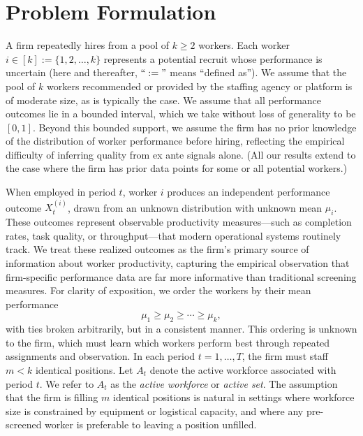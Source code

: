 \documentclass[opre,blindrev]{informs3}
\begin{document}
\section{Problem Formulation}
\label{formulation}

A firm repeatedly hires from a pool of \(k \ge 2\) workers. Each worker \(i \in [k] := \{1,2,\dots,k\}\) represents a potential recruit whose performance is uncertain (here and thereafter, \(``:="\) means ``defined as''). We assume that the pool of \(k\) workers recommended or provided by the staffing agency or platform is of moderate size, as is typically the case.
We assume that all performance outcomes lie in a bounded interval, which we take without loss of generality to be \([0,1]\). 
Beyond this bounded support, we assume the firm has no prior knowledge of the distribution of worker performance before hiring, reflecting the empirical difficulty of inferring quality from ex ante signals alone. (All our results extend to the case where the firm has prior data points for some or all potential workers.)

When employed in period $t$, worker \(i\) produces an independent performance outcome \(X_t^{(i)}\), drawn from an unknown distribution with unknown mean \(\mu_i\). These outcomes represent observable productivity measures---such as completion rates, task quality, or throughput---that modern operational systems routinely track. We treat these realized outcomes as the firm's primary source of information about worker productivity, capturing the empirical observation that firm-specific performance data are far more informative than traditional screening measures. For clarity of exposition, we order the workers by their mean performance 
\[
    \mu_1 \geq \mu_2 \geq \cdots \geq \mu_k,
\]
with ties broken arbitrarily, but in a consistent manner. This ordering is unknown to the firm, which must learn which workers perform best through repeated assignments and observation. In each period \(t = 1, \dots, T\), the firm must staff \(m < k\) identical positions. Let \(A_t\) denote the active workforce associated with period \(t\). We refer to \(A_t\) as the \emph{active workforce} or \emph{active set}. The assumption that the firm is filling \(m\) identical positions is natural in settings where workforce size is constrained by equipment or logistical capacity, and where any pre-screened worker is preferable to leaving a position unfilled.
\end{document}
